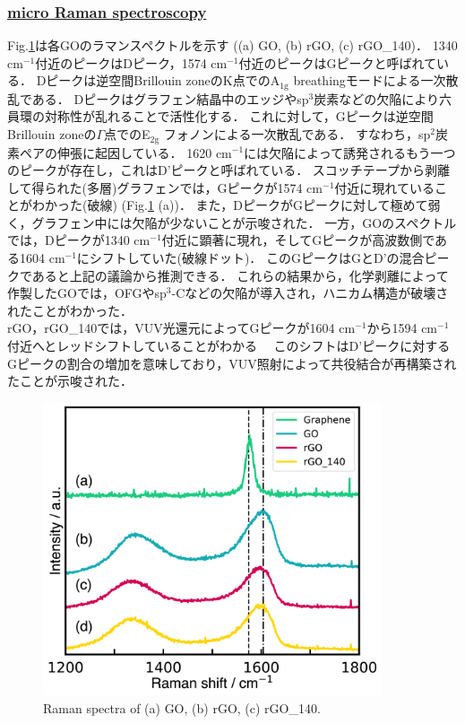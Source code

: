\documentclass[platex,dvipdfmx]{jlreq}			%
\begin{document}
\subsubsection*{\ul{micro Raman spectroscopy}}
Fig.\ref{fig:Raman}は各GOのラマンスペクトルを示す ((a) GO, (b) rGO, (c) rGO\_140)．
1340 cm$^{-1}$付近のピークはDピーク，1574 cm$^{-1}$付近のピークはGピークと呼ばれている．
Dピークは逆空間Brillouin zoneのK点でのA$_{\mathrm{1g}}$ breathingモードによる一次散乱である．
Dピークはグラフェン結晶中のエッジやsp$^3$炭素などの欠陥により六員環の対称性が乱れることで活性化する．
これに対して，Gピークは逆空間Brillouin zoneの$\Gamma$点でのE$_{\mathrm{2g}}$ フォノンによる一次散乱である．
すなわち，sp$^2$炭素ペアの伸張に起因している．
1620 cm$^{-1}$には欠陥によって誘発されるもう一つのピークが存在し，これはD'ピークと呼ばれている．
スコッチテープから剥離して得られた(多層)グラフェンでは，Gピークが1574 cm$^{-1}$付近に現れていることがわかった(破線) (Fig.\ref{fig:Raman} (a))．
また，DピークがGピークに対して極めて弱く，グラフェン中には欠陥が少ないことが示唆された．
一方，GOのスペクトルでは，Dピークが1340 cm$^{-1}$付近に顕著に現れ，そしてGピークが高波数側である1604 cm$^{-1}$にシフトしていた(破線ドット)．
このGピークはGとD'の混合ピークであると上記の議論から推測できる．
これらの結果から，化学剥離によって作製したGOでは，OFGやsp$^3$-Cなどの欠陥が導入され，ハニカム構造が破壊されたことがわかった．\\
\indent
rGO，rGO\_140では，VUV光還元によってGピークが1604 cm$^{-1}$から1594 cm$^{-1}$付近へとレッドシフトしていることがわかる　
このシフトはD'ピークに対するGピークの割合の増加を意味しており，VUV照射によって共役結合が再構築されたことが示唆された．

\begin{figure}[H]
    \centering
    \includegraphics[width=100mm]{figures/figure4.png}
    \caption{Raman spectra of (a) GO, (b) rGO, (c) rGO\_140.}
    \label{fig:Raman}
\end{figure}
\end{document}
